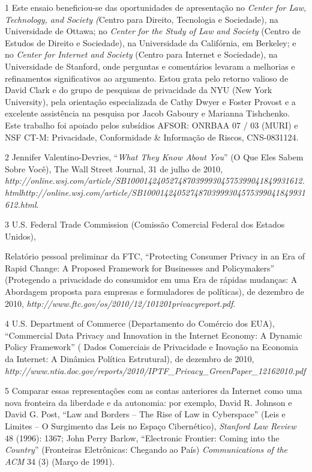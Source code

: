 1 Este ensaio beneficiou-se das oportunidades de apresentação no
\emph{Center for Law, Technology, and Society (}Centro para Direito,
Tecnologia e Sociedade), na Universidade de Ottawa; no \emph{Center for
the Study of Law and Society} (Centro de Estudos de Direito e
Sociedade), na Universidade da Califórnia, em Berkeley; e no
\emph{Center for Internet and Society} (Centro para Internet e
Sociedade), na Universidade de Stanford, onde perguntas e comentários
levaram a melhorias e refinamentos significativos ao argumento. Estou
grata pelo retorno valioso de David Clark e do grupo de pesquisas de
privacidade da NYU (New York University), pela orientação especializada
de Cathy Dwyer e Foster Provost e a excelente assistência na pesquisa
por Jacob Gaboury e Marianna Tishchenko. Este trabalho foi apoiado pelos
subsídios AFSOR: ONRBAA 07 / 03 (MURI) e NSF CT-M: Privacidade,
Conformidade \& Informação de Riscos, CNS-0831124.

2 Jennifer Valentino-Devries, ``\emph{What They Know About You}'' (O Que
Eles Sabem Sobre Você), The Wall Street Journal, 31 de julho de 2010,
\emph{http://online.wsj.com/article/SB10001424052748703999304575399041849931612.html}\emph{http://online.wsj.com/article/SB10001424052748703999304575399041849931612.html}.

3 U.S. Federal Trade Commission (Comissão Comercial Federal dos Estados
Unidos),

Relatório pessoal preliminar da FTC, ``Protecting Consumer Privacy in an
Era of Rapid Change: A Proposed Framework for Businesses and
Policymakers'' (Protegendo a privacidade do consumidor em uma Era de
rápidas mudanças: A Abordagem proposta para empresas e formuladores de
políticas), de dezembro de 2010,
\emph{http://www.ftc.gov/os/2010/12/101201privacyreport.pdf}.

4 U.S. Department of Commerce (Departamento do Comércio dos EUA),
``Commercial Data Privacy and Innovation in the Internet Economy: A
Dynamic Policy Framework'' ( Dados Comerciais de Privacidade e Inovação
na Economia da Internet: A Dinâmica Política Estrutural), de dezembro de
2010,
\emph{http://www.ntia.doc.gov/reports/2010/IPTF\_Privacy\_GreenPaper\_12162010.pdf}

5 Comparar essas representações com as contas anteriores da Internet
como uma nova fronteira da liberdade e da autonomia: por exemplo, David
R. Johnson e David G. Post, ``Law and Borders -- The Rise of Law in
Cyberspace'' (Leis e Limites -- O Surgimento das Leis no Espaço
Cibernético), \emph{Stanford Law Review} 48 (1996): 1367; John Perry
Barlow, ``Electronic Frontier: Coming into the \emph{Country}''
(Fronteiras Eletrônicas: Chegando ao País) \emph{Communications of the
ACM} 34 (3) (Março de 1991).

